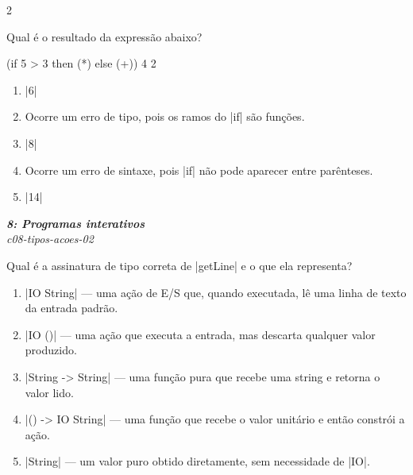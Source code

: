 \documentclass[a4paper,10pt,brazil]{article}
\begin{document}
\begin{multicols}{2}
\begin{flushright}
\end{flushright}
Qual é o resultado da expressão abaixo?
\begin{haskellcode}
(if 5 > 3 then (*) else (+)) 4 2
\end{haskellcode}

\begin{enumerate}
  \item \haskellinline|6|

  \item Ocorre um erro de tipo, pois os ramos do \haskellinline|if| são funções.

  \item \haskellinline|8|

  \item Ocorre um erro de sintaxe, pois \haskellinline|if| não pode aparecer entre parênteses.

  \item \haskellinline|14|


\end{enumerate}

\begin{flushright}
  \footnotesize
  \textit{\textbf{8: Programas interativos}}\\
  \textit{c08-tipos-acoes-02}\\

\end{flushright}
Qual é a assinatura de tipo correta de \haskellinline|getLine| e o que ela representa?

\begin{enumerate}
  \item \haskellinline|IO String| — uma ação de E/S que, quando executada, lê uma linha de texto da entrada padrão.

  \item \haskellinline|IO ()| — uma ação que executa a entrada, mas descarta qualquer valor produzido.

  \item \haskellinline|String -> String| — uma função pura que recebe uma string e retorna o valor lido.

  \item \haskellinline|() -> IO String| — uma função que recebe o valor unitário e então constrói a ação.

  \item \haskellinline|String| — um valor puro obtido diretamente, sem necessidade de \haskellinline|IO|.



\end{enumerate}
\end{multicols}
\end{document}
